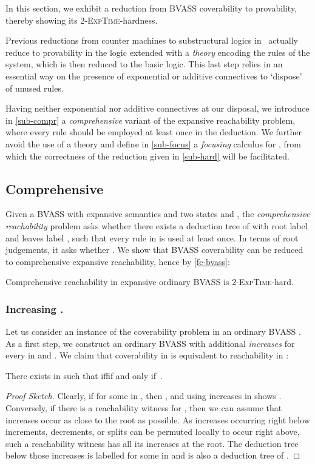 In this section, we exhibit a reduction from BVASS coverability to
 provability, thereby showing its \textsc{2-ExpTime}-hardness.

Previous reductions from counter machines to substructural logics
in~\citep{lincoln92,urquhart99,lazic14} actually reduce to provability
in the logic extended with a \emph{theory} encoding the rules of the
system, which is then reduced to the basic logic.  This last step
relies in an essential way on the presence of exponential or additive
connectives to `dispose' of unused rules.

Having neither exponential nor additive connectives at our disposal,
we introduce in \autoref{sub-compr} a \emph{comprehensive} variant of
the expansive reachability problem, where every rule should be
employed at least once in the deduction.  We further avoid the use of
a theory and define in \autoref{sub-focus} a \emph{focusing} calculus
for , from which the correctness of the reduction given in
\autoref{sub-hard} will be facilitated.

\subsection{Comprehensive }\label{sub-compr}
Given a BVASS  with expansive semantics and two
states  and , the \emph{comprehensive reachability}
problem asks whether there exists a deduction tree of  with root
label  and leaves label , such that
every rule in  is used at least once.  In terms of root
judgements, it asks whether .
We show that BVASS coverability can be reduced to comprehensive
expansive reachability, hence by \autoref{fc-bvass}:
\begin{proposition}\label{prop-compr}
  Comprehensive reachability in expansive ordinary BVASS is
  \textsc{2-ExpTime}-hard.
\end{proposition}

\subsubsection{Increasing .\nopunct}
Let us consider an instance  of the coverability
problem in an ordinary BVASS .  As a first
step, we construct an ordinary BVASS
 with additional
\emph{increases}  for every  in  and
.  We claim that coverability in  is equivalent to
reachability in :
\begin{claim}\label{cl-cov-inc}
  There exists  in  such that  \ifshort iff\else if and only if\fi\ .
\end{claim}
\begin{proof}[Proof Sketch]
Clearly, if  for some  in
, then , and using
increases in  shows .
Conversely, if there is a reachability witness for
, then we can assume that increases
 occur as close to the root as possible.  As
increases occurring right below increments, decrements, or splits can
be permuted locally to occur right above, such a reachability witness
has all its increases at the root.  The deduction tree below those
increases is labelled  for some  in  and is
also a deduction tree of .
\end{proof}

